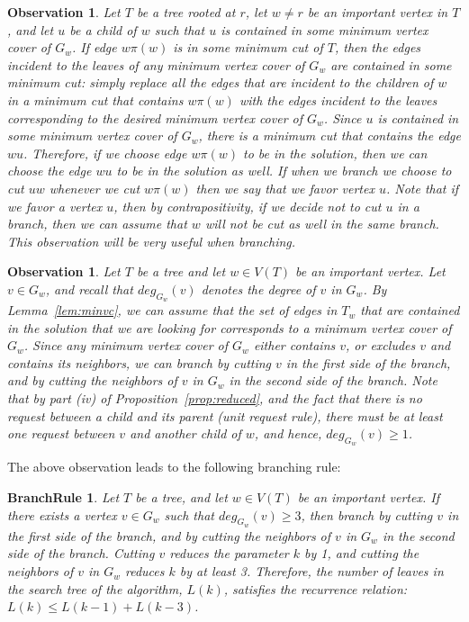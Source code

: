 \documentclass[11pt]{article}
\newtheorem{observation}[theorem]{Observation}
\newtheorem{branchrule}[theorem]{BranchRule}
\begin{document}
\begin{observation}\rm  Let $T$ be a tree rooted at $r$, let $w \neq r$ be an important vertex in $T$, and let $u$ be a child of $w$ such that $u$ is contained in some minimum vertex cover of $G_w$. If edge $w\pi(w)$ is in some minimum cut of $T$, then the edges incident to the leaves of any minimum vertex cover of $G_w$ are contained in some minimum cut: simply replace all the edges that are incident to the children of $w$ in a minimum cut that contains $w\pi(w)$ with the edges incident to the leaves corresponding to the desired minimum vertex cover of $G_w$. Since $u$ is contained in some minimum vertex cover of $G_w$, there is a minimum cut that contains the edge $wu$. Therefore, if we choose edge $w\pi(w)$ to be in the solution, then we can choose the edge $wu$ to be in the solution as well. If when we branch we choose to cut $uw$ whenever we cut $w\pi(w)$ then we say that we {\em favor} vertex $u$. Note that if we favor a vertex $u$, then by contrapositivity, if we decide not to cut $u$ in a branch, then we can assume that $w$ will not be cut as well in the same branch. This observation will be very useful when branching.
\end{observation}

\begin{observation}\rm
Let $T$ be a tree and let $w \in V(T)$ be an important vertex. Let $v \in G_w$, and recall that $deg_{G_w}(v)$ denotes the degree of $v$ in $G_w$. By Lemma~\ref{lem:minvc}, we can assume that the set of edges in $T_w$ that are contained in the solution that we are looking for corresponds to a minimum vertex cover of $G_w$. Since any minimum vertex cover of $G_w$ either contains $v$, or excludes $v$ and contains its neighbors, we can branch by cutting $v$ in the first side of the branch, and by cutting the neighbors of $v$ in $G_w$ in the second side of the branch. Note that by part (iv) of Proposition~\ref{prop:reduced}, and the fact that there is no request between a child and its parent (unit request rule), there must be at least one request between $v$ and another child of $w$, and hence, $deg_{G_w}(v) \geq 1$. \\
\end{observation}

The above observation leads to the following branching rule:

\begin{branchrule}\label{branch:1}
Let $T$ be a tree, and let $w \in V(T)$ be an important vertex. If there exists a vertex $v \in G_w$ such that $deg_{G_w}(v) \geq 3$, then branch by cutting $v$ in the first side of the branch, and by cutting the neighbors of $v$ in $G_w$ in the second side of the branch. Cutting $v$ reduces the parameter $k$ by 1, and cutting the neighbors of $v$ in $G_w$ reduces $k$ by at least 3. Therefore, the number of leaves in the search tree of the algorithm, $L(k)$, satisfies the recurrence relation: $L(k) \leq L(k-1) + L(k-3)$.
\end{branchrule}
\end{document}
